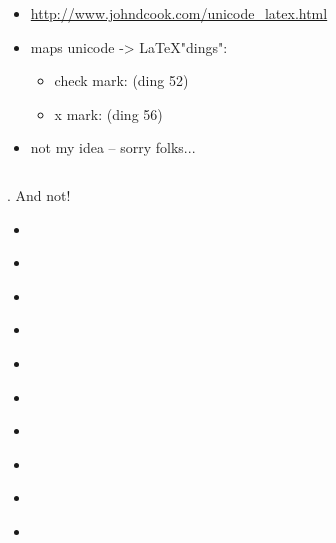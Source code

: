 {
\begin{itemize}
\item \url{http://www.johndcook.com/unicode\_latex.html}
\item maps unicode -> \LaTeX "dings":
\begin{itemize}
\item check mark:  (ding 52)
\item x mark:  (ding 56)
\end{itemize}
\item not my idea -- sorry folks...
\end{itemize}

\begin{columns}

\begin{column}{0.45\textwidth}
\begin{center}
\color{red}
\fontsize{60}{70}\selectfont
{}
\end{center}
\end{column}

\begin{column}{0.45\textwidth}
\begin{center}
\color{green}
\fontsize{60}{70}\selectfont
{}
\end{center}
\end{column}

\end{columns}
}


{
{  }
{  }
{  }
{  }
{ . }
And not!

\vspace{1em}
\begin{itemize}
  \item {  }
  \item {  }
  \item {  }
  \item {  }
  \item {  }
  \item {  }
  \item {  }
  \item {  }
  \item {  }
  \item {  }
\end{itemize}
}
